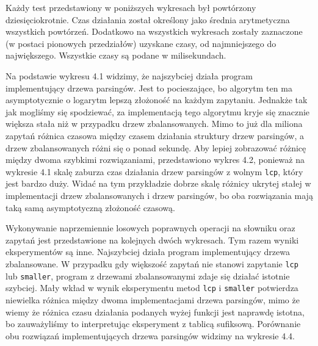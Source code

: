 \documentclass[declaration,shortabstract]{iithesis}
\theoremstyle{definition} \newtheorem{definition}{Definicja}[chapter]
\theoremstyle{plain} \newtheorem{remark}[definition]{Obserwacja}
\theoremstyle{plain} \newtheorem{theorem}[definition]{Twierdzenie}
\theoremstyle{plain} \newtheorem{example}{Przykład}[definition]
\theoremstyle{plain} \newtheorem{lemma}[definition]{Lemat}
\begin{document}
Każdy test przedstawiony w poniższych wykresach był powtórzony dziesięciokrotnie. Czas działania został określony jako średnia arytmetyczna wszystkich powtórzeń. Dodatkowo na wszystkich wykresach zostały zaznaczone (w postaci pionowych przedziałów) uzyskane czasy, od najmniejszego do największego. Wszystkie czasy są podane w milisekundach.

Na podstawie wykresu 4.1 widzimy, że najszybciej działa program implementujący drzewa parsingów. Jest to pocieszające, bo algorytm ten ma asymptotycznie o logarytm lepszą złożoność na każdym zapytaniu. Jednakże tak jak mogliśmy się spodziewać, za implementacją tego algorytmu kryje się znacznie większa stała niż w przypadku drzew zbalansowanych. Mimo to już dla miliona zapytań różnica czasowa między czasem działania struktury drzew parsingów, a drzew zbalansowanych różni się o ponad sekundę. Aby lepiej zobrazować różnicę między dwoma szybkimi rozwiązaniami, przedstawiono wykres 4.2, ponieważ na wykresie 4.1 skalę zaburza czas działania drzew parsingów z wolnym \texttt{lcp}, który jest bardzo duży. Widać na tym przykładzie dobrze skalę różnicy ukrytej stałej w implementacji drzew zbalansowanych i drzew parsingów, bo oba rozwiązania mają taką samą asymptotyczną złożoność czasową. 

\begin{figure}[!htb]
    \centering
    \scalebox{0.8}{}
\end{figure}

\begin{figure}[!htb]
    \centering
    \scalebox{0.8}{}
\end{figure}

Wykonywanie naprzemiennie losowych poprawnych operacji na słowniku oraz zapytań jest przedstawione na kolejnych dwóch wykresach. Tym razem wyniki eksperymentów są inne. Najszybciej działa program implementujący drzewa zbalansowane. W przypadku gdy większość zapytań nie stanowi zapytanie \texttt{lcp} lub \texttt{smaller}, program z drzewami zbalansowanymi zdaje się działać istotnie szybciej. Mały wkład w wynik eksperymentu metod \texttt{lcp} i \texttt{smaller} potwierdza niewielka różnica między dwoma implementacjami drzewa parsingów, mimo że wiemy że różnica czasu działania podanych wyżej funkcji jest naprawdę istotna, bo zauważyliśmy to interpretując eksperyment z tablicą sufiksową. Porównanie obu rozwiązań implementujących drzewa parsingów widzimy na wykresie 4.4.

\begin{figure}[!htb]
    \centering
    \scalebox{0.8}{}
\end{figure}
\end{document}
